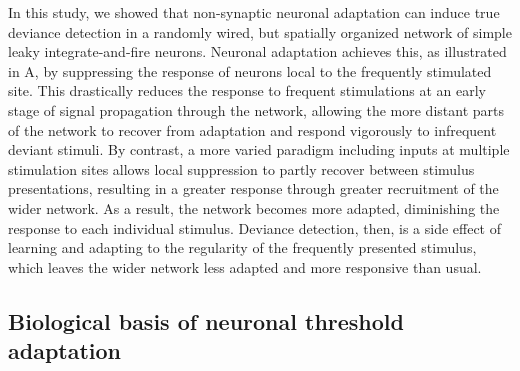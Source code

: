 \documentclass[9pt,lineno,onehalfspacing]{elife}
\begin{document}
In this study, we showed that non-synaptic neuronal adaptation can induce true deviance detection in a randomly wired, but spatially organized network of simple leaky integrate-and-fire neurons. Neuronal adaptation achieves this, as illustrated in A, by suppressing the response of neurons local to the frequently stimulated site. This drastically reduces the response to frequent stimulations at an early stage of signal propagation through the network, allowing the more distant parts of the network to recover from adaptation and respond vigorously to infrequent deviant stimuli. By contrast, a more varied paradigm including inputs at multiple stimulation sites allows local suppression to partly recover between stimulus presentations, resulting in a greater response through greater recruitment of the wider network. As a result, the network becomes more adapted, diminishing the response to each individual stimulus. Deviance detection, then, is a side effect of learning and adapting to the regularity of the frequently presented stimulus, which leaves the wider network less adapted and more responsive than usual.

\subsection{Biological basis of neuronal threshold adaptation}
\end{document}
